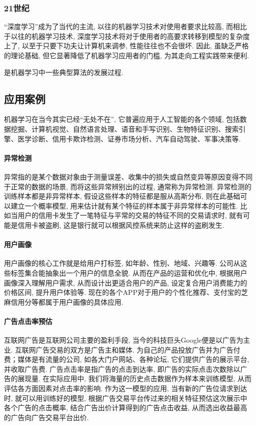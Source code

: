 \documentclass[lang=cn,11pt,a4paper]{elegantpaper}
\begin{document}
\subsubsection*{21世纪}
“深度学习”成为了当代的主流, 以往的机器学习技术对使用者要求比较高, 而相比于以往的机器学习技术, 深度学习技术将对于使用者的高要求转移到模型的复杂度上了, 以至于只要下功夫让计算机来调参, 性能往往也不会很坏. 因此, 虽缺乏严格的理论基础, 但它显著降低了机器学习应用者的门槛, 为其走向工程实践带来便利.
\par {} 是机器学习中一些典型算法的发展过程.
\subsection{应用案例}
\par 机器学习在当今其实已经“无处不在”, 它普遍应用于人工智能的各个领域, 包括数据挖掘、计算机视觉、自然语言处理、语音和手写识别、生物特征识别、搜索引擎、医学诊断、信用卡欺诈检测、证券市场分析、汽车自动驾驶、军事决策等.
\paragraph{异常检测}异常指的是某个数据对象由于测量误差、收集中的损失或自然变异等原因变得不同于正常的数据的场景, 而将这些异常辨别出的过程, 通常称为异常检测. 异常检测的训练样本都是非异常样本, 假设这些样本的特征都是服从高斯分布, 则在此基础可以建立一个概率模型, 用来估计就有某个特征的样本属于非异常样本的可能性. 比如当用户的信用卡发生了一笔特征与平常的交易的特征不同的交易请求时, 就有可能是信用卡被盗刷, 这是银行就可以根据风控系统来防止这样的盗刷发生.
\paragraph{用户画像}用户画像的核心工作就是给用户打标签, 如年龄、性别、地域、兴趣等. 公司从这些标签集合能抽象出一个用户的信息全貌. 从而在产品的运营和优化中, 根据用户画像深入理解用户需求, 从而设计出更适合用户的产品, 设定复合用户消费能力的价格区间, 提升用户体验等. 现在的各个APP对于用户的个性化推荐、支付宝的芝麻信用分等都属于用户画像的具体应用.
\paragraph{广告点击率预估}互联网广告是互联网公司主要的盈利手段, 当今的科技巨头Google便是以广告为主业. 互联网广告交易的双方是广告主和媒体. 为自己的产品投放广告并为广告付费；媒体是有流量的公司, 如各大门户网站、各种论坛, 它们提供广告的展示平台, 并收取广告费. 广告点击率是指广告的点击到达率, 即广告的实际点击次数除以广告的展现量. 在实际应用中, 我们将海量的历史点击数据作为样本来训练模型, 从而评估各方面因素对点击率的影响. 作为这一模型的应用, 当有新的广告位请求到达时, 就可以用训练好的模型, 根据广告交易平台传过来的相关特征预估这次展示中各个广告的点击概率, 结合广告出价计算得到的广告点击收益, 从而选出收益最高的广告向广告交易平台出价. 
\end{document}
